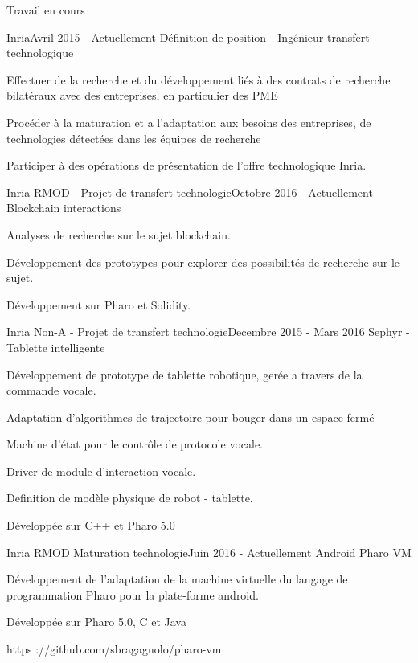 \documentclass{resume} %
\begin{document}
\begin{rSection}{Travail en cours}
	\begin{rSubsection}{Inria}{Avril 2015 - Actuellement }{D\'efinition de position - Ing\'{e}nieur transfert technologique}
		\item Effectuer de la recherche et du d\'{e}veloppement li\'{e}s \`a des contrats de recherche bilat\'{e}raux avec des entreprises, en particulier des PME 
		\item Proc\'{e}der \`a la maturation et  a  l'adaptation aux besoins des entreprises, de technologies d\'{e}tect\'{e}es dans les \'{e}quipes de recherche 
		\item Participer  \`a  des op\'{e}rations de pr\'{e}sentation de l'offre technologique Inria. 
	\end{rSubsection}
	
	\begin{rSubsection}{Inria RMOD - Projet de transfert technologie}{Octobre 2016 - Actuellement }{Blockchain interactions}
		\item Analyses de recherche sur le sujet blockchain. 
		\item D\'{e}veloppement des prototypes pour explorer des possibilit\'{e}s de recherche sur le sujet.
		\item D\'{e}veloppement sur Pharo et Solidity. 
	\end{rSubsection}
	
	\begin{rSubsection}{Inria Non-A - Projet de transfert technologie}{Decembre 2015 - Mars 2016 }{Sephyr - Tablette intelligente }
		\item D\'{e}veloppement de prototype de tablette robotique, ger\'{e}e a travers de la commande vocale. 
		\item Adaptation d'algorithmes de trajectoire pour bouger dans un espace ferm\'{e}
		\item Machine d'\'{e}tat pour le contr\^ole de protocole vocale. 
		\item Driver de module d'interaction vocale.  
		\item Definition de mod\`ele physique de robot - tablette. 
		\item D\'{e}velopp\'{e}e sur C++ et Pharo 5.0
	\end{rSubsection}
	
	\begin{rSubsection}{Inria RMOD Maturation technologie}{Juin 2016 - Actuellement }{Android Pharo VM}
		\item D\'{e}veloppement de l'adaptation de la  machine virtuelle du langage de programmation Pharo pour la plate-forme android.
		\item D\'{e}velopp\'{e}e sur Pharo 5.0, C et Java
 		\item https ://github.com/sbragagnolo/pharo-vm		
	\end{rSubsection}
	

\end{rSection}
\end{document}
